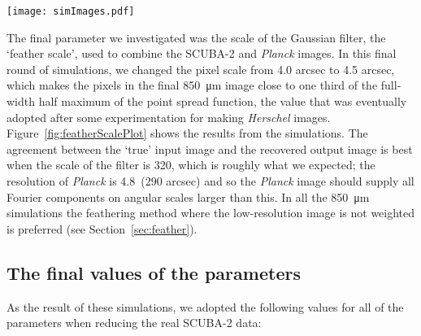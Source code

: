 \documentclass[a4paper,fleqn,usenatbib, twocolumn]{aastex63}
\begin{document}
\begin{figure*}
  \centering
  \texttt{[image: simImages.pdf]}
  \caption{The `true' input image we used in our simulations (left panel),
  the output image we recovered using the data-reduction parameters
  listed in Section~\ref{sec:finalSimParam} (middle panel) and the difference between the
  two divided by the noise estimate from the
  SCUBA-2 data-reduction pipeline (right panel). The
  colored area is the central circular region (diameter
  30 arcmin) in which the observations have their full
  sensitivity.}

  \label{fig:simImages}
\end{figure*}

The final parameter we investigated was the scale of the Gaussian filter,
the `feather scale', used to combine the SCUBA-2 and \textit{Planck} images.
In this final round of simulations, we changed the
pixel scale from 4.0 arcsec to 4.5 arcsec, which makes the
pixels in the final \SI{850}{\micro\meter} image close to one third of the full-width
half maximum of the point spread function, the value that was eventually
adopted after some experimentation for making {\it Herschel} images.
Figure~\ref{fig:featherScalePlot} shows the results from the simulations.
The agreement between the `true' input image and the recovered
output image is best when the scale of the filter is 320\arcsec, which is
roughly what we expected; the resolution of 
\textit{Planck} is 4.8\arcmin\ (290 arcsec) \citep{Planck2014hfi} and so the {\it Planck} image
should supply all Fourier components on angular scales larger
than this. In all the \SI{850}{\micro\meter} simulations the feathering method where the
low-resolution image is not weighted is preferred (see Section~\ref{sec:feather}).
 


\subsection{The final values of the parameters}
\label{sec:finalSimParam}

As the result of these simulations, we adopted the following values
for all of the parameters when reducing the real SCUBA-2 data:
\end{document}
